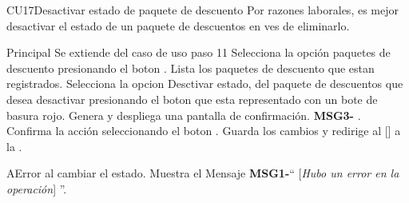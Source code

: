 \begin{UseCase}{CU17}{Desactivar estado de paquete de descuento}{
		Por razones laborales, es mejor desactivar el estado de un paquete de descuentos en ves de eliminarlo.
	}
	\end{UseCase}




	\begin{UCtrayectoria}{Principal}
		\UCpaso Se extiende del caso de uso  paso 11
		\UCpaso[\UCactor] Selecciona la opción paquetes de descuento presionando el boton .
		\UCpaso Lista los paquetes de descuento que estan registrados. 
		\UCpaso[\UCactor] Selecciona la opcion Desctivar estado, del paquete de descuentos que desea desactivar presionando el boton  que esta representado con un bote de basura rojo.		
		\UCpaso Genera y despliega una pantalla de confirmación.  {\bf MSG3-} .
		\UCpaso[\UCactor] Confirma la acción seleccionando el boton . 
		\UCpaso Guarda los cambios y redirige al [\UCactor] a la  .
	\end{UCtrayectoria}




\begin{UCtrayectoriaA}{A}{Error al cambiar el estado.}
			\UCpaso Muestra el Mensaje {\bf MSG1-}`` [{\em Hubo un error en la operación}] ''.
			
		\end{UCtrayectoriaA}
		